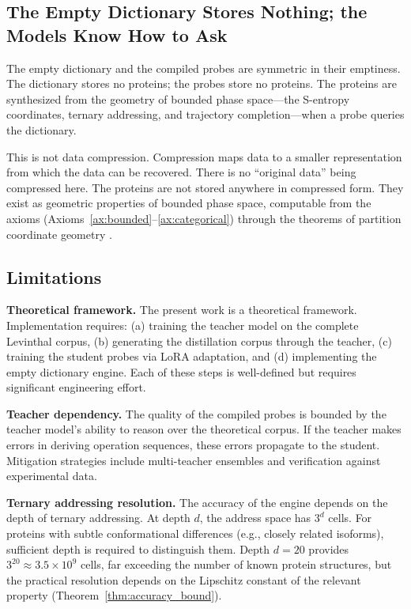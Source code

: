 \documentclass[11pt,twocolumn,a4paper]{article}
\theoremstyle{definition}
\theoremstyle{remark}
\begin{document}
\subsection{The Empty Dictionary Stores Nothing; the Models Know How to Ask}

The empty dictionary and the compiled probes are symmetric in their emptiness. The dictionary stores no proteins; the probes store no proteins. The proteins are synthesized from the geometry of bounded phase space---the S-entropy coordinates, ternary addressing, and trajectory completion---when a probe queries the dictionary.

This is not data compression. Compression maps data to a smaller representation from which the data can be recovered. There is no ``original data'' being compressed here. The proteins are not stored anywhere in compressed form. They exist as geometric properties of bounded phase space, computable from the axioms (Axioms~\ref{ax:bounded}--\ref{ax:categorical}) through the theorems of partition coordinate geometry \citep{sachikonye2025a}.

\subsection{Limitations}

\textbf{Theoretical framework.} The present work is a theoretical framework. Implementation requires: (a) training the teacher model on the complete Levinthal corpus, (b) generating the distillation corpus through the teacher, (c) training the student probes via LoRA adaptation, and (d) implementing the empty dictionary engine. Each of these steps is well-defined but requires significant engineering effort.

\textbf{Teacher dependency.} The quality of the compiled probes is bounded by the teacher model's ability to reason over the theoretical corpus. If the teacher makes errors in deriving operation sequences, these errors propagate to the student. Mitigation strategies include multi-teacher ensembles and verification against experimental data.

\textbf{Ternary addressing resolution.} The accuracy of the engine depends on the depth of ternary addressing. At depth $d$, the address space has $3^d$ cells. For proteins with subtle conformational differences (e.g., closely related isoforms), sufficient depth is required to distinguish them. Depth $d = 20$ provides $3^{20} \approx 3.5 \times 10^9$ cells, far exceeding the number of known protein structures, but the practical resolution depends on the Lipschitz constant of the relevant property (Theorem~\ref{thm:accuracy_bound}).
\end{document}

